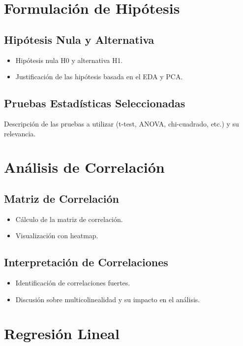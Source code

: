 \documentclass{article}
\begin{document}
\section{Formulación de Hipótesis}
\subsection{Hipótesis Nula y Alternativa}
\begin{itemize}
    \item Hipótesis nula H0 y alternativa H1.
    \item Justificación de las hipótesis basada en el EDA y PCA.
\end{itemize}

\subsection{Pruebas Estadísticas Seleccionadas}
Descripción de las pruebas a utilizar (t-test, ANOVA, chi-cuadrado, etc.) y su relevancia.

\section{Análisis de Correlación}
\subsection{Matriz de Correlación}
\begin{itemize}
    \item Cálculo de la matriz de correlación.
    \item Visualización con heatmap.
\end{itemize}

\subsection{Interpretación de Correlaciones}
\begin{itemize}
    \item Identificación de correlaciones fuertes.
    \item Discusión sobre multicolinealidad y su impacto en el análisis.
\end{itemize}

\section{Regresión Lineal}
\end{document}
